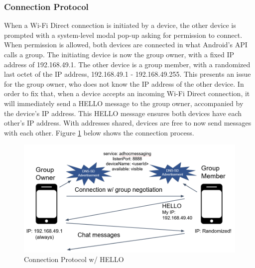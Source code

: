 \documentclass[10pt]{article}
\begin{document}
\subsubsection{Connection Protocol}
When a Wi-Fi Direct connection is initiated by a device, the other device is prompted with a system-level modal pop-up asking for permission to connect. When permission is allowed, both devices are connected in what Android's API calls a group. The initiating device is now the group owner, with a fixed IP address of 192.168.49.1. The other device is a group member, with a randomized last octet of the IP address, 192.168.49.1 - 192.168.49.255. This presents an issue for the group owner, who does not know the IP address of the other device. In order to fix that, when a device accepts an incoming Wi-Fi Direct connection, it will immediately send a HELLO message to the group owner, accompanied by the device's IP address. This HELLO message ensures both devices have each other's IP address. With addresses shared, devices are free to now send messages with each other. Figure \ref{backend:proto} below shows the connection process.

\begin{figure}[h]
    \centering
    \includegraphics[width=5in]{proto.png}
    \caption{Connection Protocol w/ HELLO}
    \label{backend:proto}
\end{figure}
\end{document}
